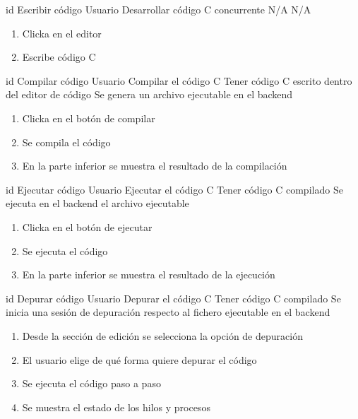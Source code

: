\printuctemplate{}

\begin{useCase}{id}
    {Escribir código} %
    {Usuario} %
    {Desarrollar código C concurrente}  %
    {N/A}  %
    {N/A} %
    \begin{enumerate} %
        \item Clicka en el editor
        \item Escribe código C 
    \end{enumerate}
\end{useCase}

\begin{useCase}{id}
    {Compilar código}
    {Usuario}
    {Compilar el código C}
    {Tener código C escrito dentro del editor de código}
    {Se genera un archivo ejecutable en el backend}
    \begin{enumerate}
        \item Clicka en el botón de compilar
        \item Se compila el código
        \item En la parte inferior se muestra el resultado de la compilación
    \end{enumerate}
\end{useCase}

\begin{useCase}{id}
    {Ejecutar código}
    {Usuario}
    {Ejecutar el código C}
    {Tener código C compilado}
    {Se ejecuta en el backend el archivo ejecutable}
    \begin{enumerate}
        \item Clicka en el botón de ejecutar
        \item Se ejecuta el código
        \item En la parte inferior se muestra el resultado de la ejecución
    \end{enumerate}
\end{useCase}

\begin{useCase}{id}
    {Depurar código}
    {Usuario}
    {Depurar el código C}
    {Tener código C compilado}
    {Se inicia una sesión de depuración respecto al fichero ejecutable en el backend}
    \begin{enumerate}
        \item Desde la sección de edición se selecciona la opción de depuración
        \item El usuario elige de qué forma quiere depurar el código
        \item Se ejecuta el código paso a paso
        \item Se muestra el estado de los hilos y procesos
    \end{enumerate}
\end{useCase}

